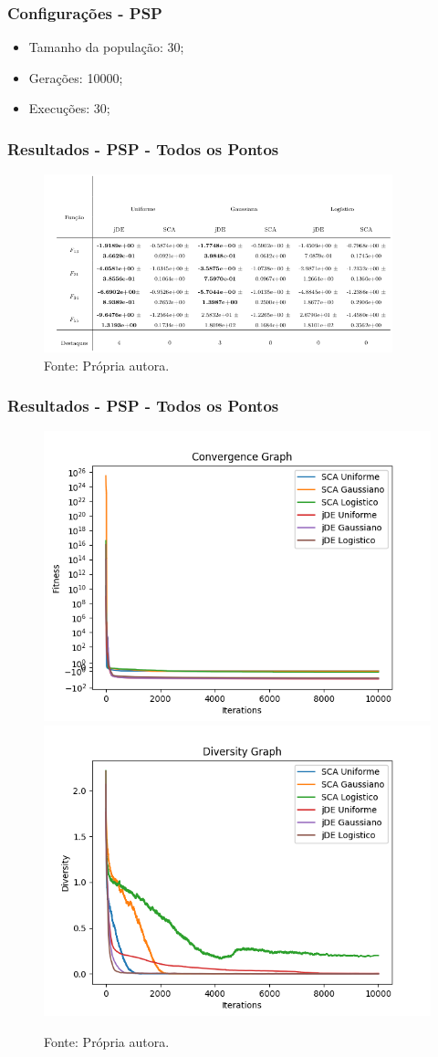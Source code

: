 \documentclass{beamer}
\newcommand{\source}[1]{\vspace{-6pt} \caption*{Fonte: {#1}} }
\begin{document}
\begin{frame}
\frametitle{Configurações - PSP}
\begin{itemize}
    \item Tamanho da população: 30;
    \item Gerações: 10000;
    \item Execuções: 30;
\end{itemize}
\end{frame}

\begin{frame}
\frametitle{Resultados - PSP - Todos os Pontos}
\begin{figure}[tbph]
\centering
\includegraphics[width=0.9\textwidth]{tabResultadosPSP1.png}
\source{Própria autora.}
\label{tab:resPSP1}
\end{figure}
\end{frame}

\begin{frame}
\frametitle{Resultados - PSP - Todos os Pontos}
\begin{figure}[tbph]
\centering
\includegraphics[width=0.49\linewidth]{convF34.png}
\includegraphics[width=0.49\linewidth]{divF34.png}
\source{Própria autora.}
\label{fig:grafF34}
\end{figure}
\end{frame}
\end{document}
